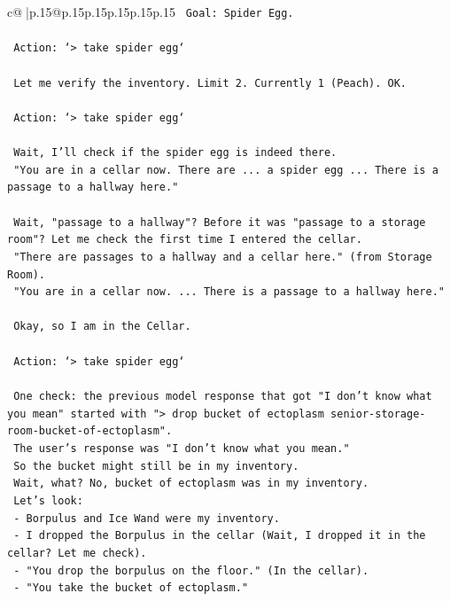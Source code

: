 \documentclass{article}
\begin{document}
{\begin{supertabular}{c@{$\;$}|p{.15\linewidth}@{}p{.15\linewidth}p{.15\linewidth}p{.15\linewidth}p{.15\linewidth}p{.15\linewidth}}
{{{\texttt{    Goal: Spider Egg.} \\
\\ 
\texttt{    Action: `> take spider egg`} \\
\\ 
\texttt{    Let me verify the inventory. Limit 2. Currently 1 (Peach). OK.} \\
\\ 
\texttt{    Action: `> take spider egg`} \\
\\ 
\texttt{    Wait, I'll check if the spider egg is indeed there.} \\
\texttt{    "You are in a cellar now. There are ... a spider egg ... There is a passage to a hallway here."} \\
\\ 
\texttt{    Wait, "passage to a hallway"? Before it was "passage to a storage room"? Let me check the first time I entered the cellar.} \\
\texttt{    "There are passages to a hallway and a cellar here." (from Storage Room).} \\
\texttt{    "You are in a cellar now. ... There is a passage to a hallway here."} \\
\\ 
\texttt{    Okay, so I am in the Cellar.} \\
\\ 
\texttt{    Action: `> take spider egg`} \\
\\ 
\texttt{    One check: the previous model response that got "I don't know what you mean" started with "> drop bucket of ectoplasm senior{-}storage{-}room{-}bucket{-}of{-}ectoplasm".} \\
\texttt{    The user's response was "I don't know what you mean."} \\
\texttt{    So the bucket might still be in my inventory.} \\
\texttt{    Wait, what? No, bucket of ectoplasm was in my inventory.} \\
\texttt{    Let's look:} \\
\texttt{    {-} Borpulus and Ice Wand were my inventory.} \\
\texttt{    {-} I dropped the Borpulus in the cellar (Wait, I dropped it in the cellar? Let me check).} \\
\texttt{    {-} "You drop the borpulus on the floor." (In the cellar).} \\
\texttt{    {-} "You take the bucket of ectoplasm."} \\
}}}
\end{supertabular}}
\end{document}
